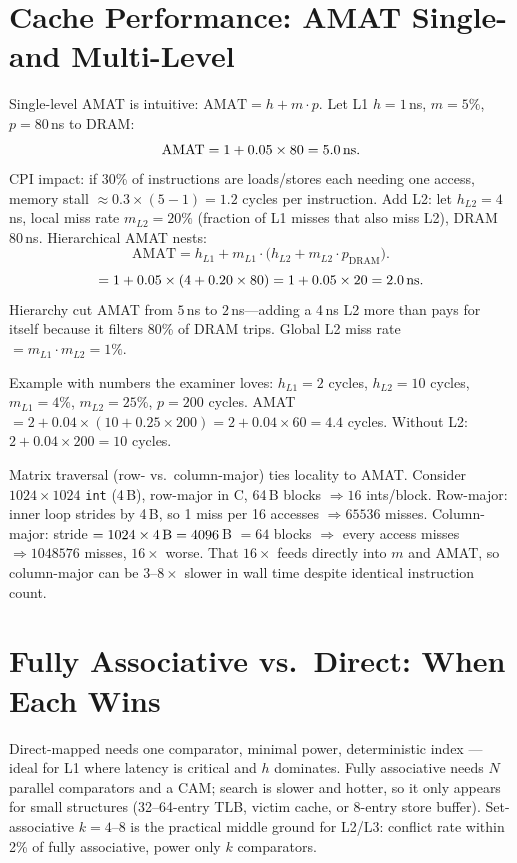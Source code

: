 \section{Cache Performance: AMAT Single- and Multi-Level}
Single-level AMAT is intuitive: $\text{AMAT}=h + m\cdot p$. Let L1 $h=1$\,ns, $m=5\%$, $p=80$\,ns to DRAM:
\[ \text{AMAT}=1 + 0.05\times 80 = 5.0\text{\,ns}. \]
CPI impact: if 30\% of instructions are loads/stores each needing one access, memory stall $\approx 0.3\times(5-1)=1.2$ cycles per instruction.
Add L2: let $h_{L2}=4$\,ns, local miss rate $m_{L2}=20\%$ (fraction of L1 misses that also miss L2), DRAM $80$\,ns. Hierarchical AMAT nests:
\[ \text{AMAT}=h_{L1}+m_{L1}\cdot\big(h_{L2}+m_{L2}\cdot p_{\text{DRAM}}\big). \]
\[ =1+0.05\times(4+0.20\times80)=1+0.05\times20=2.0\text{\,ns}. \]
Hierarchy cut AMAT from $5$\,ns to $2$\,ns---adding a 4\,ns L2 more than pays for itself because it filters 80\% of DRAM trips. Global L2 miss rate $=m_{L1}\cdot m_{L2}=1\%$.

Example with numbers the examiner loves: $h_{L1}=2$ cycles, $h_{L2}=10$ cycles, $m_{L1}=4\%$, $m_{L2}=25\%$, $p=200$ cycles.
AMAT $=2+0.04\times(10+0.25\times200)=2+0.04\times60=4.4$ cycles. Without L2: $2+0.04\times200=10$ cycles.

Matrix traversal (row- vs.\ column-major) ties locality to AMAT. Consider $1024\times1024$ \texttt{int} (4\,B), row-major in C, 64\,B blocks $\Rightarrow 16$ ints/block.
Row-major: inner loop strides by 4\,B, so 1 miss per 16 accesses $\Rightarrow 65536$ misses.
Column-major: stride $=1024\times4\text{\,B}=4096$\,B $=64$ blocks $\Rightarrow$ every access misses $\Rightarrow 1048576$ misses, $16\times$ worse. That $16\times$ feeds directly into $m$ and AMAT, so column-major can be $3$--$8\times$ slower in wall time despite identical instruction count.

\section{Fully Associative vs.\ Direct: When Each Wins}
Direct-mapped needs one comparator, minimal power, deterministic index --- ideal for L1 where latency is critical and $h$ dominates. Fully associative needs $N$ parallel comparators and a CAM; search is slower and hotter, so it only appears for small structures (32--64-entry TLB, victim cache, or 8-entry store buffer). Set-associative $k=4$--$8$ is the practical middle ground for L2/L3: conflict rate within 2\% of fully associative, power only $k$ comparators.

